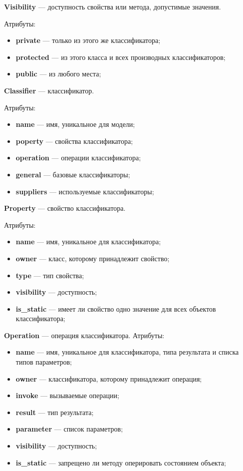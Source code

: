 \textbf{Visibility} --- доступность свойства или метода, допустимые значения.

Атрибуты:
\begin{itemize}
\item \textbf{private} --- только из этого же классификатора;
\item \textbf{protected} --- из этого класса и всех производных классификаторов;
\item \textbf{public} --- из любого места;
\end{itemize}

\textbf{Classifier} --- классификатор.

Атрибуты:
\begin{itemize}
\item \textbf{name} --- имя, уникальное для модели;
\item \textbf{poperty} --- свойства классификатора;
\item \textbf{operation} --- операции классификатора;
\item \textbf{general} --- базовые классификаторы;
\item \textbf{suppliers} --- используемые классификаторы;
\end{itemize}

\textbf{Property} --- свойство классификатора.

Атрибуты:
\begin{itemize}
\item \textbf{name} --- имя, уникальное для классификатора;
\item \textbf{owner} --- класс, которому принадлежит свойство;
\item \textbf{type} --- тип свойства;
\item \textbf{visibility} --- доступность;
\item \textbf{is\_static} --- имеет ли свойство одно значение для всех объектов классификатора;
\end{itemize}

\textbf{Operation} --- операция классификатора.
Атрибуты:
\begin{itemize}
\item \textbf{name} --- имя, уникальное для классификатора, типа результата и списка типов параметров;
\item \textbf{owner} --- классификатора, которому принадлежит операция;
\item \textbf{invoke} --- вызываемые операции;
\item \textbf{result} --- тип результата;
\item \textbf{parameter} --- список параметров;
\item \textbf{visibility} --- доступность;
\item \textbf{is\_static} --- запрещено ли методу оперировать состоянием объекта;
\end{itemize}

